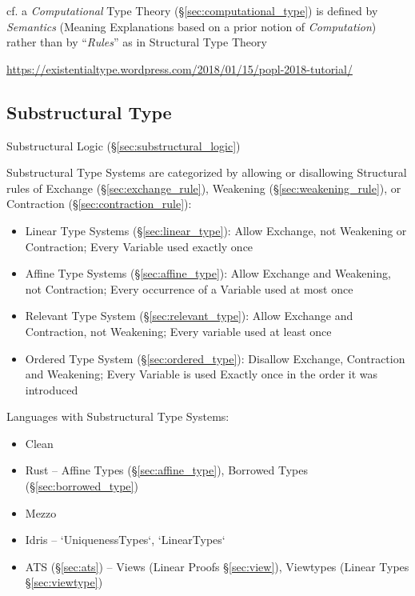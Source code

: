 cf. a \emph{Computational} Type Theory (\S\ref{sec:computational_type}) is
defined by \emph{Semantics} (Meaning Explanations based on a prior notion of
\emph{Computation}) rather than by ``\emph{Rules}'' as in Structural Type
Theory

\url{https://existentialtype.wordpress.com/2018/01/15/popl-2018-tutorial/}



\subsection{Substructural Type}
\label{sec:substructural_type}

Substructural Logic (\S\ref{sec:substructural_logic})

Substructural Type Systems are categorized by allowing or disallowing
Structural rules of Exchange (\S\ref{sec:exchange_rule}), Weakening
(\S\ref{sec:weakening_rule}), or Contraction
(\S\ref{sec:contraction_rule}):

\begin{itemize}
  \item Linear Type Systems (\S\ref{sec:linear_type}): Allow Exchange,
    not Weakening or Contraction; Every Variable used exactly once
  \item Affine Type Systems (\S\ref{sec:affine_type}): Allow Exchange
    and Weakening, not Contraction; Every occurrence of a Variable
    used at most once
  \item Relevant Type System (\S\ref{sec:relevant_type}): Allow
    Exchange and Contraction, not Weakening; Every variable used at
    least once
  \item Ordered Type System (\S\ref{sec:ordered_type}): Disallow
    Exchange, Contraction and Weakening; Every Variable is used
    Exactly once in the order it was introduced
\end{itemize}

Languages with Substructural Type Systems:

\begin{itemize}
  \item Clean
  \item Rust -- Affine Types (\S\ref{sec:affine_type}), Borrowed
    Types (\S\ref{sec:borrowed_type})
  \item Mezzo
  \item Idris -- `UniquenessTypes`, `LinearTypes`
  \item ATS (\S\ref{sec:ats}) -- Views (Linear Proofs
    \S\ref{sec:view}), Viewtypes (Linear Types \S\ref{sec:viewtype})
\end{itemize}

